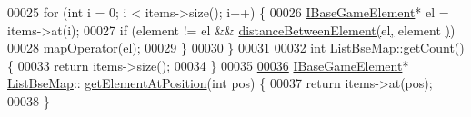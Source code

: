 \begin{DoxyCode}
00025   \textcolor{keywordflow}{for} (\textcolor{keywordtype}{int} i = 0; i < items->size(); i++) \{
00026     \hyperlink{a00137_ae2be75da1a2a9edfabe993770e24654a}{IBaseGameElement}* el = items->at(i);
00027     \textcolor{keywordflow}{if} (element != el && \hyperlink{a00068_a1ab36c07a61bd9f450ed0ac1ba68ed94}{distanceBetweenElement}\hyperlink{a00068_a1ab36c07a61bd9f450ed0ac1ba68ed94}{(}el\hyperlink{a00068_a1ab36c07a61bd9f450ed0ac1ba68ed94}{,} element
      \hyperlink{a00068_a1ab36c07a61bd9f450ed0ac1ba68ed94}{)})
00028       mapOperator(el);
00029   \}
00030 \}
00031 
\hyperlink{a00169_a78e72bacec177f3512323c5fc7db11f3}{00032} \textcolor{keywordtype}{int} \hyperlink{a00169_a72a6386e492d05685e86f7fb858e3b32}{ListBseMap}::\hyperlink{a00169_a78e72bacec177f3512323c5fc7db11f3}{getCount}() \{
00033   \textcolor{keywordflow}{return} items->size();
00034 \}
00035 
\hyperlink{a00169_a6725c6e4231705df32b1074b0b5fdda5}{00036} \hyperlink{a00137_ae2be75da1a2a9edfabe993770e24654a}{IBaseGameElement}* \hyperlink{a00169_a72a6386e492d05685e86f7fb858e3b32}{ListBseMap}::
      \hyperlink{a00169_a6725c6e4231705df32b1074b0b5fdda5}{getElementAtPosition}(\textcolor{keywordtype}{int} pos) \{
00037   \textcolor{keywordflow}{return} items->at(pos);
00038 \}
\end{DoxyCode}
